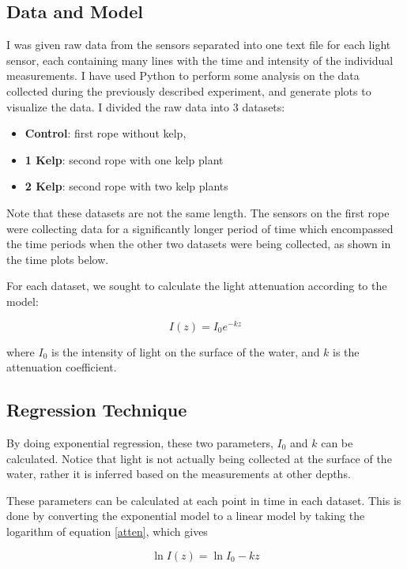 \subsection{Data and Model}
I was given raw data from the sensors separated into one text file for each light sensor, each containing many lines with the time and intensity of the individual measurements. I have used Python to perform some analysis on the data collected during the previously described experiment, and generate plots to visualize the data. I divided the raw data into 3 datasets:
\begin{itemize}
	\item \textbf{Control}: first rope without kelp,
	\item \textbf{1 Kelp}: second rope with one kelp plant
	\item \textbf{2 Kelp}: second rope with two kelp plants
\end{itemize}

Note that these datasets are not the same length. The sensors on the first rope were collecting data for a significantly longer period of time which encompassed the time periods when the other two datasets were being collected, as shown in the time plots below.

For each dataset, we sought to calculate the light attenuation according to the model:

\begin{equation}
	I(z) = I_0e^{-kz}
	\label{atten}
\end{equation}

where $I_0$ is the intensity of light on the surface of the water, and $k$ is the attenuation coefficient.

\pagebreak
\subsection{Regression Technique}
By doing exponential regression, these two parameters, $I_0$ and $k$ can be calculated. Notice that light is not actually being collected at the surface of the water, rather it is inferred based on the measurements at other depths.

These parameters can be calculated at each point in time in each dataset. This is done by converting the exponential model to a linear model by taking the logarithm of equation \ref{atten}, which gives

\begin{equation}
	\ln I(z) = \ln I_0 - kz
	\label{log_atten}
\end{equation}

